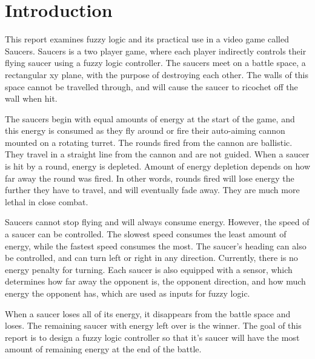 \section{Introduction}

This report examines fuzzy logic and its practical use in a video game called Saucers. Saucers is a two player game, where each player indirectly controls their flying saucer using a fuzzy logic controller. The saucers meet on a battle space, a rectangular xy plane, with the purpose of destroying each other. The walls of this space cannot be travelled through, and will cause the saucer to ricochet off the wall when hit.

The saucers begin with equal amounts of energy at the start of the game, and this energy is consumed as they fly around or fire their auto-aiming cannon mounted on a rotating turret. The rounds fired from the cannon are ballistic. They travel in a straight line from the cannon and are not guided. When a saucer is hit by a round, energy is depleted. Amount of energy depletion depends on how far away the round was fired. In other words, rounds fired will lose energy the further they have to travel, and will eventually fade away. They are much more lethal in close combat.

Saucers cannot stop flying and will always consume energy. However, the speed of a saucer can be controlled. The slowest speed consumes the least amount of energy, while the fastest speed consumes the most. The saucer's heading can also be controlled, and can turn left or right in any direction. Currently, there is no energy penalty for turning. Each saucer is also equipped with a sensor, which determines how far away the opponent is, the opponent direction, and how much energy the opponent has, which are used as inputs for fuzzy logic.

When a saucer loses all of its energy, it disappears from the battle space and loses. The remaining saucer with energy left over is the winner. The goal of this report is to design a fuzzy logic controller so that it's saucer will have the most amount of remaining energy at the end of the battle.